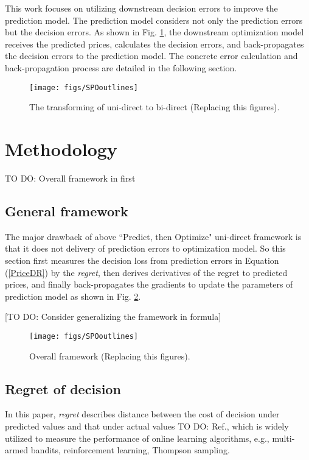 \documentclass[journal]{IEEEtran}
\newcommand{\slw}{\color{blue}}
\begin{document}
This work focuses on utilizing downstream decision errors to improve the prediction model. The prediction model considers not only the prediction errors but the decision errors. As shown in Fig. \ref{transforming}, the downstream optimization model receives the predicted prices, calculates the decision errors, and back-propagates the decision errors to the prediction model. The concrete error calculation and back-propagation process are detailed in the following section.

\begin{figure}[ht]
  \centering
  \texttt{[image: figs/SPOoutlines]}
  \caption{The transforming of uni-direct to bi-direct (Replacing this figures).}
  \label{transforming}
\end{figure}

\section{Methodology}
{\slw TO DO: Overall framework in first}

\subsection{General framework}
The major drawback of above ``Predict, then Optimize" uni-direct framework is that it does not delivery of prediction errors to optimization model. So this section first measures the decision loss from prediction errors in Equation (\ref{PriceDR}) by the \textit{regret}, then derives derivatives of the regret to predicted prices, and finally back-propagates the gradients to update the parameters of prediction model as shown in Fig. \ref{SPO}.

{\slw [TO DO: Consider generalizing the framework in formula]}

\begin{figure}[ht]
  \centering
  \texttt{[image: figs/SPOoutlines]}
  \caption{Overall framework (Replacing this figures).}
  \label{SPO}
\end{figure}

\subsection{Regret of decision}
In this paper, \textit{regret} describes distance between the cost of decision under predicted values and that under actual values \cite{Sutton2018} {\slw TO DO: Ref.}, which is widely utilized to measure the performance of online learning algorithms, e.g., multi-armed bandits, reinforcement learning, Thompson sampling.
\end{document}
